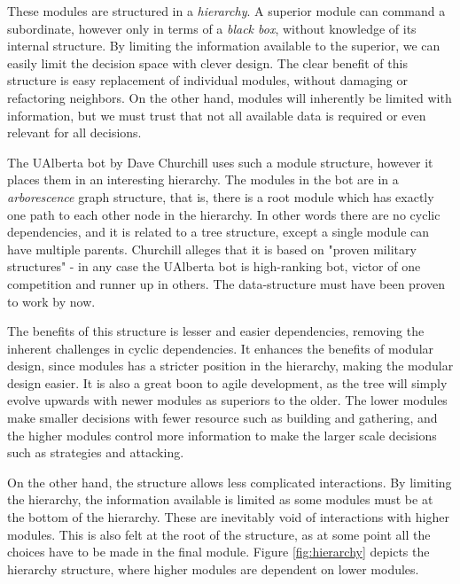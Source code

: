 These modules are structured in a \emph{hierarchy}. A superior module can command a subordinate, however only in terms of a \emph{black box}, without knowledge of its internal structure. By limiting the information available to the superior, we can easily limit the decision space with clever design. The clear benefit of this structure is easy replacement of individual modules, without damaging or refactoring neighbors. On the other hand, modules will inherently be limited with information, but we must trust that not all available data is required or even relevant for all decisions.

The UAlberta bot by Dave Churchill uses such a module structure, however it places them in an interesting hierarchy. The modules in the bot are in a \emph{arborescence} graph structure, that is, there is a root module which has exactly one path to each other node in the hierarchy. In other words there are no cyclic dependencies, and it is related to a tree structure, except a single module can have multiple parents. Churchill alleges that it is based on "proven military structures" - in any case the UAlberta bot is high-ranking bot, victor of one competition and runner up in others. The data-structure must have been proven to work by now.

The benefits of this structure is lesser and easier dependencies, removing the inherent challenges in cyclic dependencies. It enhances the benefits of modular design, since modules has a stricter position in the hierarchy, making the modular design easier. It is also a great boon to agile development, as the tree will simply evolve upwards with newer modules as superiors to the older. The lower modules make smaller decisions with fewer resource such as building and gathering, and the higher modules control more information to make the larger scale decisions such as strategies and attacking.

On the other hand, the structure allows less complicated interactions. By limiting the hierarchy, the information available is limited as some modules must be at the bottom of the hierarchy. These are inevitably void of interactions with higher modules. This is also felt at the root of the structure, as at some point all the choices have to be made in the final module. Figure \ref{fig:hierarchy} depicts the hierarchy structure, where higher modules are dependent on lower modules.

